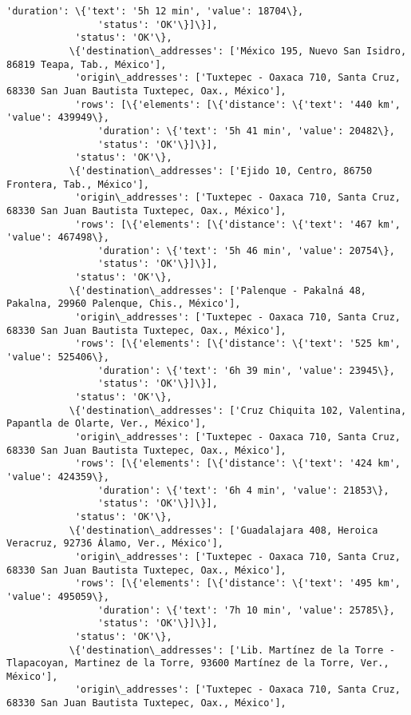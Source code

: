 \documentclass[11pt]{article}
\begin{document}
\begin{Verbatim}[commandchars=\\\{\}]
                'duration': \{'text': '5h 12 min', 'value': 18704\},
                'status': 'OK'\}]\}],
            'status': 'OK'\},
           \{'destination\_addresses': ['México 195, Nuevo San Isidro, 86819 Teapa, Tab., México'],
            'origin\_addresses': ['Tuxtepec - Oaxaca 710, Santa Cruz, 68330 San Juan Bautista Tuxtepec, Oax., México'],
            'rows': [\{'elements': [\{'distance': \{'text': '440 km', 'value': 439949\},
                'duration': \{'text': '5h 41 min', 'value': 20482\},
                'status': 'OK'\}]\}],
            'status': 'OK'\},
           \{'destination\_addresses': ['Ejido 10, Centro, 86750 Frontera, Tab., México'],
            'origin\_addresses': ['Tuxtepec - Oaxaca 710, Santa Cruz, 68330 San Juan Bautista Tuxtepec, Oax., México'],
            'rows': [\{'elements': [\{'distance': \{'text': '467 km', 'value': 467498\},
                'duration': \{'text': '5h 46 min', 'value': 20754\},
                'status': 'OK'\}]\}],
            'status': 'OK'\},
           \{'destination\_addresses': ['Palenque - Pakalná 48, Pakalna, 29960 Palenque, Chis., México'],
            'origin\_addresses': ['Tuxtepec - Oaxaca 710, Santa Cruz, 68330 San Juan Bautista Tuxtepec, Oax., México'],
            'rows': [\{'elements': [\{'distance': \{'text': '525 km', 'value': 525406\},
                'duration': \{'text': '6h 39 min', 'value': 23945\},
                'status': 'OK'\}]\}],
            'status': 'OK'\},
           \{'destination\_addresses': ['Cruz Chiquita 102, Valentina, Papantla de Olarte, Ver., México'],
            'origin\_addresses': ['Tuxtepec - Oaxaca 710, Santa Cruz, 68330 San Juan Bautista Tuxtepec, Oax., México'],
            'rows': [\{'elements': [\{'distance': \{'text': '424 km', 'value': 424359\},
                'duration': \{'text': '6h 4 min', 'value': 21853\},
                'status': 'OK'\}]\}],
            'status': 'OK'\},
           \{'destination\_addresses': ['Guadalajara 408, Heroica Veracruz, 92736 Álamo, Ver., México'],
            'origin\_addresses': ['Tuxtepec - Oaxaca 710, Santa Cruz, 68330 San Juan Bautista Tuxtepec, Oax., México'],
            'rows': [\{'elements': [\{'distance': \{'text': '495 km', 'value': 495059\},
                'duration': \{'text': '7h 10 min', 'value': 25785\},
                'status': 'OK'\}]\}],
            'status': 'OK'\},
           \{'destination\_addresses': ['Lib. Martínez de la Torre - Tlapacoyan, Martinez de la Torre, 93600 Martínez de la Torre, Ver., México'],
            'origin\_addresses': ['Tuxtepec - Oaxaca 710, Santa Cruz, 68330 San Juan Bautista Tuxtepec, Oax., México'],

\end{Verbatim}
\end{document}
